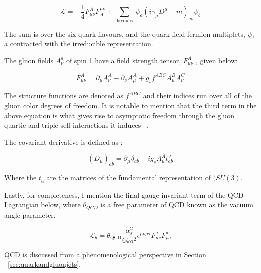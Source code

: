 \begin{equation}
\mathcal{L}=-\frac{1}{4} F_{\mu \nu}^{A} F_{A}^{\mu \nu}+\sum_{\text {flavours }} \overline{\psi}_{a}\left(i \gamma_{\mu} D^{\mu}-m\right)_{a b} \psi_{b}
\end{equation}


The sum is over the six quark flavours, and the quark field fermion multiplets, $\psi$, a contracted with the irreducible representation.~\cite{Crewther:1995wq}

The gluon fields $A_{\nu}^a$ of spin 1 have a field strength tensor, $F_{\mu \nu}^{A}$ , given below:\newline 

\begin{equation}
F_{\mu \nu}^{A}=\partial_{\mu} A_{\nu}^{A}-\partial_{\nu} A_{\mu}^{A}+g_{s} f^{A B C} A_{\mu}^{B} A_{\nu}^{C}
\end{equation}


The structure functions are denoted as $f^{A B C}$ and their indices run over all of the gluon color degrees of freedom. It is notable to mention that the third term in the above equation is what gives rise to asymptotic freedom through the gluon quartic and triple self-interactions it induces ~\cite{Crewther:1995wq}.

The covariant derivative is defined as :\newline

\begin{equation}
\left(D_{\mu}\right)_{a b}=\partial_{\mu} \delta_{a b}-i g_{s} A_{\mu}^{A} t_{a b}^{A}
\end{equation}

Where the $t_{a}$ are the matrices of the fundamental representation of $(SU(3)$.

Lastly, for completeness, I mention the final gauge invariant term of the QCD Lagrangian below, where $\theta_{QCD}$ is a free parameter of QCD known as the vacuum angle parameter.

\begin{equation}
\mathcal{L}_{\theta}=\theta_{\mathrm{QCD}} \frac{\alpha_{s}^{2}}{64 \pi^{2}} \epsilon^{\mu \nu \rho \sigma} F_{\mu \nu}^{a} F_{\rho \sigma}^{a}
\end{equation}


QCD is discussed from a phenomenological perspective in Section ~\ref{sec:quarkandgluonjets}. 













